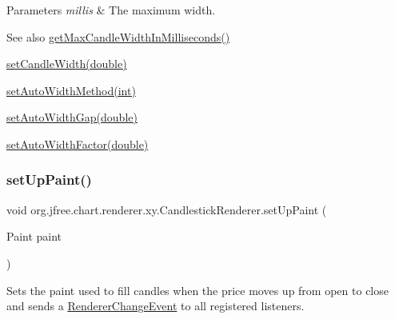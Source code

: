 \begin{DoxyParams}{Parameters}
{\em millis} & The maximum width.\\
\hline
\end{DoxyParams}
\begin{DoxySeeAlso}{See also}
\mbox{\hyperlink{classorg_1_1jfree_1_1chart_1_1renderer_1_1xy_1_1_candlestick_renderer_a6c06bc6b4e7471616cd59579e342ddb8}{get\+Max\+Candle\+Width\+In\+Milliseconds()}} 

\mbox{\hyperlink{classorg_1_1jfree_1_1chart_1_1renderer_1_1xy_1_1_candlestick_renderer_a212b98d88bbc173df25fcafd7f983ff3}{set\+Candle\+Width(double)}} 

\mbox{\hyperlink{classorg_1_1jfree_1_1chart_1_1renderer_1_1xy_1_1_candlestick_renderer_a556f4cc791dcf82be3e4e82c6f82dd66}{set\+Auto\+Width\+Method(int)}} 

\mbox{\hyperlink{classorg_1_1jfree_1_1chart_1_1renderer_1_1xy_1_1_candlestick_renderer_ae86e0bc0453129bf8579ae7a5d2ee821}{set\+Auto\+Width\+Gap(double)}} 

\mbox{\hyperlink{classorg_1_1jfree_1_1chart_1_1renderer_1_1xy_1_1_candlestick_renderer_a0189cacb382b9e002ad932e555a79664}{set\+Auto\+Width\+Factor(double)}} 
\end{DoxySeeAlso}
\mbox{\label{classorg_1_1jfree_1_1chart_1_1renderer_1_1xy_1_1_candlestick_renderer_aecca1e61a2e3d8ed2532c05de9c2bd39}} 
\subsubsection{\texorpdfstring{set\+Up\+Paint()}{setUpPaint()}}
{\footnotesize\ttfamily void org.\+jfree.\+chart.\+renderer.\+xy.\+Candlestick\+Renderer.\+set\+Up\+Paint (\begin{DoxyParamCaption}\item[{Paint}]{paint }\end{DoxyParamCaption})}

Sets the paint used to fill candles when the price moves up from open to close and sends a \mbox{\hyperlink{}{Renderer\+Change\+Event}} to all registered listeners.


